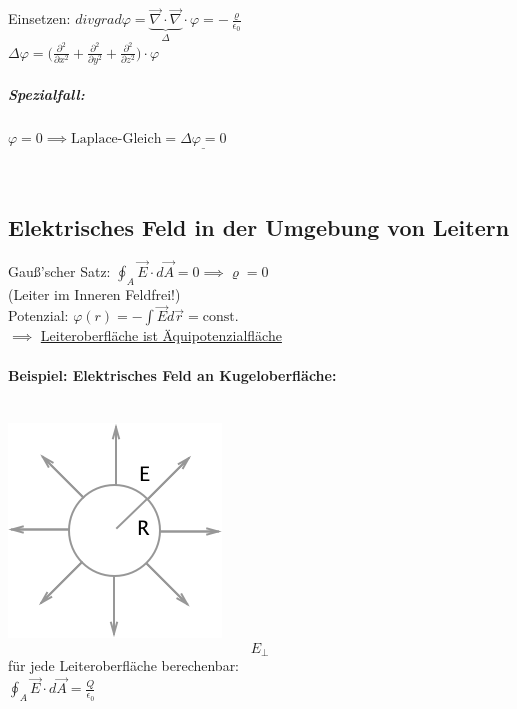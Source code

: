 \documentclass[11pt]{article}
\begin{document}
Einsetzen: $\boxed{div grad \varphi=\underbrace{\vec{\nabla}\cdot\vec{\nabla}}_{\Delta}\cdot\varphi = -\frac{\varrho}{\epsilon_0}}$\\

$ \Delta\varphi=\big(\frac{\partial^2}{\partial x^2}+\frac{\partial^2}{\partial y^2}+\frac{\partial^2}{\partial z^2}\big)\cdot\varphi $\\

\subparagraph{Spezialfall:}

$ \varphi=0
\implies \text{Laplace-Gleich}= \underline{\Delta\varphi=0} $

\hfill\\

\subsection{Elektrisches Feld in der Umgebung von Leitern}

Gau\ss{}'scher Satz: $ \oint_{A}\vec{E}\cdot d\vec{A}=0 \implies \varrho=0 $\\
(Leiter im Inneren Feldfrei!)\\

Potenzial: $\varphi(r)=-\int\vec{E}d\vec{r}= \text{const.}$\\

$\implies$ \underline{Leiteroberfläche ist Äquipotenzialfläche}\\

\paragraph{Beispiel: Elektrisches Feld an Kugeloberfläche:}
\hfill\\
\includegraphics{skizzen/14/14_8B0}\\

$$ E_\perp $$ für jede Leiteroberfläche berechenbar:\\

$ \displaystyle\oint_{A}\vec{E}\cdot d\vec{A} = \frac{Q}{\epsilon_0} $\\
\end{document}
